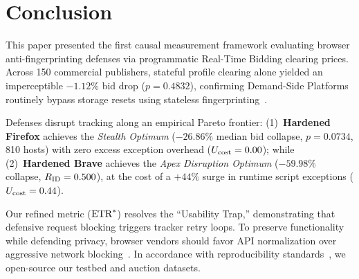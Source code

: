 \section{Conclusion}
\label{sec:conclusion}

This paper presented the first causal measurement framework evaluating browser anti-fingerprinting defenses via programmatic Real-Time Bidding clearing prices. 
Across 150 commercial publishers, stateful profile clearing alone yielded an imperceptible $-1.12\%$ bid drop ($p = 0.4832$), confirming Demand-Side Platforms routinely bypass storage resets using stateless fingerprinting~\cite{acar2014web, liu2025first}.

Defenses disrupt tracking along an empirical Pareto frontier: (1)~\textbf{Hardened Firefox} achieves the \textit{Stealth Optimum} ($-26.86\%$ median bid collapse, $p = 0.0734$, 810 hosts) with zero excess exception overhead ($U_{\text{cost}} = 0.00$); while (2)~\textbf{Hardened Brave} achieves the \textit{Apex Disruption Optimum} ($-59.98\%$ collapse, $R_{\text{ID}} = 0.500$), at the cost of a $+44\%$ surge in runtime script exceptions ($U_{\text{cost}} = 0.44$).

Our refined metric ($\text{ETR}^*$) resolves the ``Usability Trap,'' demonstrating that defensive request blocking triggers tracker retry loops. To preserve functionality while defending privacy, browser vendors should favor API normalization over aggressive network blocking~\cite{iqbal2020adgraph, tor_design}. 
In accordance with reproducibility standards~\cite{demir2022reproducibility}, we open-source our testbed and auction datasets.